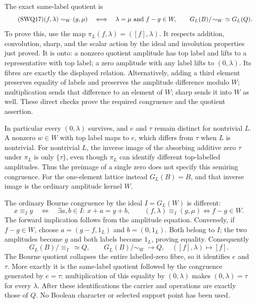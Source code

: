 \documentclass[11pt]{article}
\begin{document}
The exact same-label quotient is
\begin{equation}\tag{SWQ17}
 (f,\lambda)\sim_W(g,\mu)\quad\Longleftrightarrow\quad
 \lambda=\mu\ \hbox{and}\ f-g\in W,
 \qquad G_L(B)/\!\sim_W\ \simeq G_L(Q).
\end{equation}
To prove this, use the map
$\pi_L(f,\lambda)=([f],\lambda)$. It respects addition,
convolution, sharp, and the scalar action by the ideal and
involution properties just proved. It is onto: a nonzero quotient
amplitude has top label and lifts to a representative with top label;
a zero amplitude with any label lifts to $(0,\lambda)$.
Its fibres are exactly the displayed relation. Alternatively, adding
a third element preserves equality of labels and preserves the
amplitude difference modulo $W$; multiplication sends that difference
to an element of $W$; sharp sends it into $W$ as well. These direct
checks prove the required congruence and the quotient assertion.

In particular every $(0,\lambda)$ survives, and $e$ and $\tau$
remain distinct for nontrivial $L$. A nonzero $w\in W$ with top
label maps to $e$, which differs from $\tau$ when $L$ is nontrivial.
For nontrivial $L$, the inverse image of the absorbing
additive zero $\tau$ under $\pi_L$ is only $\{\tau\}$, even though
$\pi_L$ can identify different top-labelled amplitudes. Thus the
preimage of a single zero does not specify this semiring congruence.
For the one-element lattice instead $G_L(B)=B$, and that inverse
image is the ordinary amplitude kernel $W$.

The ordinary Bourne congruence by the ideal $I=G_L(W)$ is different:
\begin{equation}\tag{SWQ18}
 x\equiv_I y\quad\Longleftrightarrow\quad
 \exists a,b\in I:\ x+a=y+b,
 \qquad
 (f,\lambda)\equiv_I(g,\mu)\Longleftrightarrow f-g\in W.
\end{equation}
The forward implication follows from the amplitude equation.
Conversely, if $f-g\in W$, choose
$a=(g-f,1_L)$ and $b=(0,1_L)$. Both belong to $I$; the two
amplitudes become $g$ and both labels become $1_L$, proving equality.
Consequently
\begin{equation}\tag{SWQ19}
 G_L(B)/\!\equiv_I\ \simeq Q,
 \qquad
 G_L(B)/\!\sim_W\ \longrightarrow Q,
 \quad([f],\lambda)\longmapsto[f].
\end{equation}
The Bourne quotient collapses the entire labelled-zero fibre, so it
identifies $e$ and $\tau$. More exactly it is the same-label quotient
followed by the congruence generated by $e=\tau$: multiplication
of this equality by $(0,\lambda)$ makes $(0,\lambda)=\tau$ for
every $\lambda$. After these identifications the carrier and
operations are exactly those of $Q$. No Boolean character or
selected support point has been used.
\end{document}
